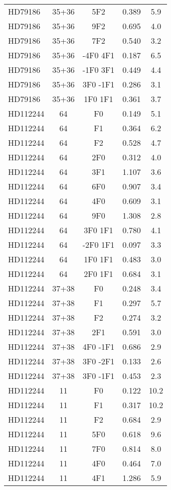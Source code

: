 \begin{table*}
\begin{tabular}{l c c c c}
HD79186 & 35+36 & 5F2 & 0.389 & 5.9\\ 
HD79186 & 35+36 & 9F2 & 0.695 & 4.0\\ 
HD79186 & 35+36 & 7F2 & 0.540 & 3.2\\ 
HD79186 & 35+36 & -4F0 4F1 & 0.187 & 6.5\\ 
HD79186 & 35+36 & -1F0 3F1 & 0.449 & 4.4\\ 
HD79186 & 35+36 & 3F0 -1F1 & 0.286 & 3.1\\ 
HD79186 & 35+36 & 1F0 1F1 & 0.361 & 3.7\\ 
\hline
HD112244 & 64 & F0 & 0.149 & 5.1\\ 
HD112244 & 64 & F1 & 0.364 & 6.2\\ 
HD112244 & 64 & F2 & 0.528 & 4.7\\ 
HD112244 & 64 & 2F0 & 0.312 & 4.0\\ 
HD112244 & 64 & 3F1 & 1.107 & 3.6\\ 
HD112244 & 64 & 6F0 & 0.907 & 3.4\\ 
HD112244 & 64 & 4F0 & 0.609 & 3.1\\ 
HD112244 & 64 & 9F0 & 1.308 & 2.8\\ 
HD112244 & 64 & 3F0 1F1 & 0.780 & 4.1\\ 
HD112244 & 64 & -2F0 1F1 & 0.097 & 3.3\\ 
HD112244 & 64 & 1F0 1F1 & 0.483 & 3.0\\ 
HD112244 & 64 & 2F0 1F1 & 0.684 & 3.1\\ 
\hline
HD112244 & 37+38 & F0 & 0.248 & 3.4\\ 
HD112244 & 37+38 & F1 & 0.297 & 5.7\\ 
HD112244 & 37+38 & F2 & 0.274 & 3.2\\ 
HD112244 & 37+38 & 2F1 & 0.591 & 3.0\\ 
HD112244 & 37+38 & 4F0 -1F1 & 0.686 & 2.9\\ 
HD112244 & 37+38 & 3F0 -2F1 & 0.133 & 2.6\\ 
HD112244 & 37+38 & 3F0 -1F1 & 0.453 & 2.3\\ 
\hline
HD112244 & 11 & F0 & 0.122 & 10.2\\ 
HD112244 & 11 & F1 & 0.317 & 10.2\\ 
HD112244 & 11 & F2 & 0.684 & 2.9\\ 
HD112244 & 11 & 5F0 & 0.618 & 9.6\\ 
HD112244 & 11 & 7F0 & 0.814 & 8.0\\ 
HD112244 & 11 & 4F0 & 0.464 & 7.0\\ 
HD112244 & 11 & 4F1 & 1.286 & 5.9\\ 

\end{tabular}
\end{table*}
